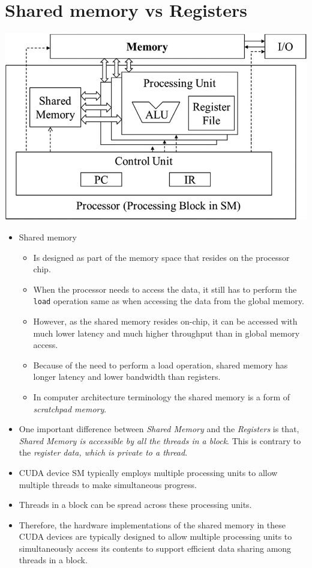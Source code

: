 \section{Shared memory vs Registers}
\begin{center}
    \includegraphics[width=0.5\linewidth]{Images/Memories/CUDA_device_SM.png}
\end{center}
\begin{itemize}
    \item Shared memory
          \begin{itemize}
              \item Is designed as part of the memory space that resides on the processor chip.
              \item When the processor needs to access the data, it still has to perform the \texttt{load} operation same as when accessing the data from the global memory.
              \item However, as the shared memory resides on-chip, it can be accessed with much lower latency and much higher throughput than in global memory access.
              \item Because of the need to perform a load operation, shared memory has longer latency and lower bandwidth than registers.
              \item In computer architecture terminology the shared memory is a form of \textsl{scratchpad memory}.
          \end{itemize}
    \item One important difference between \textsl{Shared Memory} and the \textsl{Registers} is that, \textsl{Shared Memory is accessible by all the threads in a block}. This is contrary to the \textsl{register data, which is private to a thread}.
    \item CUDA device SM typically employs multiple processing units to allow multiple threads to make simultaneous progress.
    \item Threads in a block can be spread across these processing units.
    \item Therefore, the hardware implementations of the shared memory in these CUDA devices are typically designed to allow multiple processing units to simultaneously access its contents to support efficient data sharing among threads in a block.
\end{itemize}

